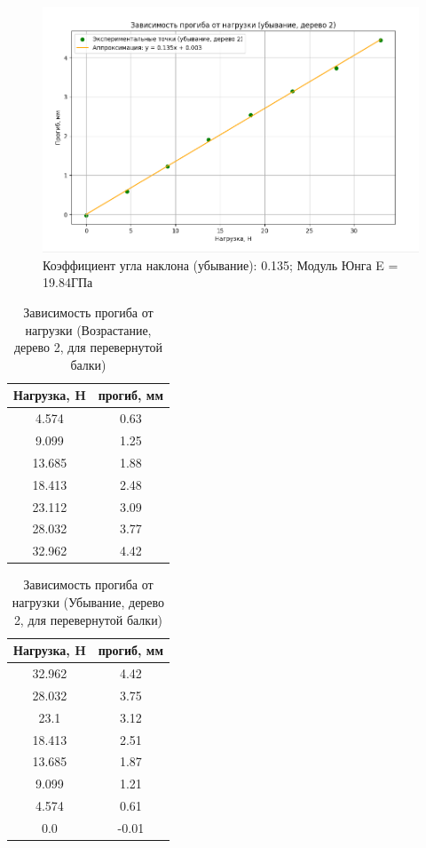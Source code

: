\documentclass[a4paper, 12pt]{article}
\begin{document}
\vspace{2cm} %

\begin{figure}[h]
\centering
\includegraphics[width=0.8\linewidth]{G6.png}
\caption{Коэффициент угла наклона (убывание): 0.135; Модуль Юнга E = 19.84ГПа}
\label{fig:decrease}
\end{figure}


\clearpage




\begin{table}[h]
\centering
\caption{Зависимость прогиба от нагрузки (Возрастание, дерево 2, для перевернутой балки)}
\begin{tabular}{|c|c|}
\hline
Нагрузка, H & прогиб, мм \\
\hline
4.574 & 0.63 \\
\hline
9.099 & 1.25 \\
\hline
13.685 & 1.88 \\
\hline
18.413 & 2.48 \\
\hline
23.112 & 3.09 \\
\hline
28.032 & 3.77 \\
\hline
32.962 & 4.42 \\
\hline
\end{tabular}
\end{table}

\begin{table}[h]
\centering
\caption{Зависимость прогиба от нагрузки (Убывание, дерево 2, для перевернутой балки)}
\begin{tabular}{|c|c|}
\hline
Нагрузка, H & прогиб, мм \\
\hline
32.962 & 4.42 \\
\hline
28.032 & 3.75 \\
\hline
23.1 & 3.12 \\
\hline
18.413 & 2.51 \\
\hline
13.685 & 1.87 \\
\hline
9.099 & 1.21 \\
\hline
4.574 & 0.61 \\
\hline
0.0 & -0.01 \\
\hline
\end{tabular}
\end{table}
\end{document}

